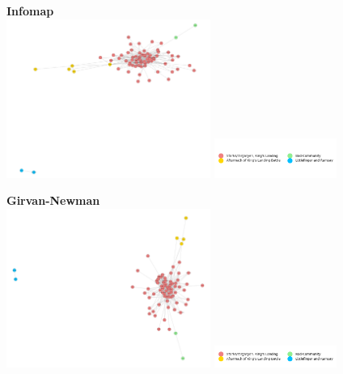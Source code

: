 \documentclass[10pt,twocolumn,letterpaper]{article}
\begin{document}
\begin{center}
    \textbf{Infomap}  \\

    \includegraphics[width=0.5\textwidth]{img/s8/communities_infomap.jpg}
    \includegraphics[width=0.3\textwidth]{img/s8/infomap_legend.jpg}\\
    \caption{\small{$\#communities=9$, $modularity=0.661$}}
\end{center}




\begin{center}
    \textbf{Girvan-Newman} \\
    \includegraphics[width=0.5\textwidth]{img/s8/communities_g-n.jpg}
    \includegraphics[width=0.3\textwidth]{img/s8/g-n_legend.jpg}\\
    \caption{\small{$\#communities=5$, $modularity=0.637$}}
\end{center}
\end{document}
